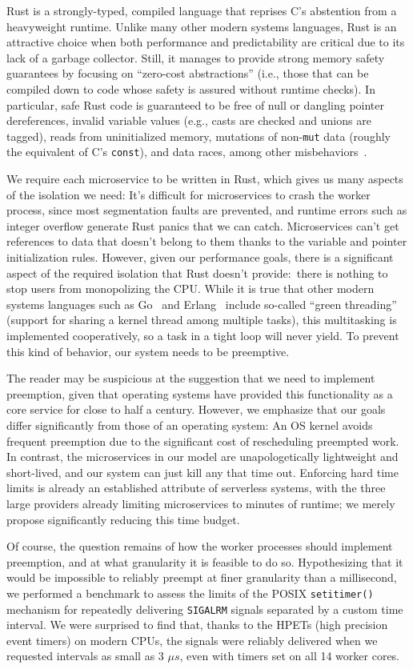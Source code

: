 Rust is a strongly-typed, compiled language that reprises C's abstention from a
heavyweight runtime.  Unlike many other modern systems languages, Rust is an
attractive choice when both performance and predictability are critical due to its
lack of a garbage collector.  Still, it manages to provide strong memory safety
guarantees by focusing on ``zero-cost abstractions'' (i.e., those that can be
compiled down to code whose safety is assured without runtime checks).  In
particular, safe Rust code is guaranteed to be free of null or dangling pointer
dereferences, invalid variable values (e.g., casts are checked and unions are
tagged), reads from uninitialized memory, mutations of non-\texttt{mut} data (roughly
the equivalent of C's \texttt{const}), and data races, among other
misbehaviors~\cite{www-rustlang-ub}.

We require each microservice to be written in Rust, which gives us many aspects of
the isolation we need:  It's difficult for microservices to crash the worker process,
since most segmentation faults are prevented, and runtime errors such as integer
overflow generate Rust panics that we can catch.  Microservices can't get references
to data that doesn't belong to them thanks to the variable and pointer initialization
rules.  However, given our performance goals, there is a significant aspect of the
required isolation that Rust doesn't provide:\ there is nothing to stop users from
monopolizing the CPU.  While it is true that other modern systems languages such as
Go~\cite{www-golang} and Erlang~\cite{www-erlang} include so-called ``green
threading'' (support for sharing a kernel thread among multiple tasks), this
multitasking is implemented cooperatively, so a task in a tight loop will never
yield.  To prevent this kind of behavior, our system needs to be preemptive.

The reader may be suspicious at the suggestion that we need to implement preemption,
given that operating systems have provided this functionality as a core service for
close to half a century.  However, we emphasize that our goals differ significantly
from those of an operating system:  An OS kernel avoids frequent preemption due to
the significant cost of rescheduling preempted work.  In contrast, the microservices
in our model are unapologetically lightweight and short-lived, and our system can
just kill any that time out.  Enforcing hard time limits is already an established
attribute of serverless systems, with the three large providers already limiting
microservices to minutes of runtime; we merely propose significantly reducing this
time budget.

Of course, the question remains of how the worker processes should implement
preemption, and at what granularity it is feasible to do so.  Hypothesizing that it
would be impossible to reliably preempt at finer granularity than a millisecond, we
performed a benchmark to assess the limits of the POSIX \texttt{setitimer()}
mechanism for repeatedly delivering \texttt{SIGALRM} signals separated by a custom
time interval.  We were surprised to find that, thanks to the HPETs (high precision
event timers) on modern CPUs, the signals were reliably delivered when we requested
intervals as small as 3 $\mu{}s$, even with timers set on all 14 worker cores.
